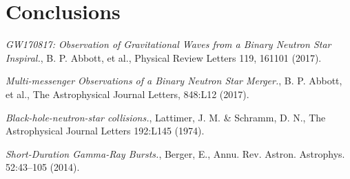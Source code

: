 \documentclass[twocolumn]{article}
\begin{document}
\section{Conclusions}\label{conclusions}




\begin{thebibliography}{9}
 \emph{GW170817: Observation of Gravitational Waves from a Binary Neutron Star Inspiral.},
B. P. Abbott, et al., Physical Review Letters 119, 161101 (2017).

 \emph{Multi-messenger Observations of a Binary Neutron Star Merger.},
B. P. Abbott, et al., The Astrophysical Journal Letters, 848:L12 (2017).

 \emph{Black-hole-neutron-star collisions.},
Lattimer, J. M. \& Schramm, D. N., The Astrophysical Journal Letters 192:L145 (1974).

 \emph{Short-Duration Gamma-Ray Bursts.},
Berger, E., Annu. Rev. Astron. Astrophys. 52:43–105 (2014).


\end{thebibliography}
\end{document}
